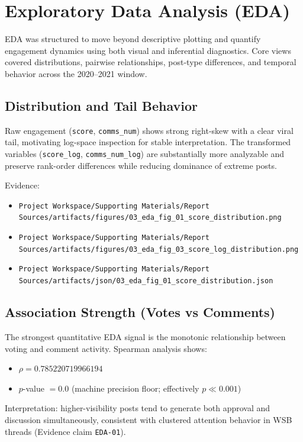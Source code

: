 \section{Exploratory Data Analysis (EDA)}

EDA was structured to move beyond descriptive plotting and quantify engagement dynamics using both visual and inferential diagnostics. Core views covered distributions, pairwise relationships, post-type differences, and temporal behavior across the 2020--2021 window.

\subsection{Distribution and Tail Behavior}
Raw engagement (\texttt{score}, \texttt{comms\_num}) shows strong right-skew with a clear viral tail, motivating log-space inspection for stable interpretation. The transformed variables (\texttt{score\_log}, \texttt{comms\_num\_log}) are substantially more analyzable and preserve rank-order differences while reducing dominance of extreme posts.

Evidence:
\begin{itemize}
  \item \verb|Project Workspace/Supporting Materials/Report Sources/artifacts/figures/03_eda_fig_01_score_distribution.png|
  \item \verb|Project Workspace/Supporting Materials/Report Sources/artifacts/figures/03_eda_fig_03_score_log_distribution.png|
  \item \verb|Project Workspace/Supporting Materials/Report Sources/artifacts/json/03_eda_fig_01_score_distribution.json|
\end{itemize}

\subsection{Association Strength (Votes vs Comments)}
The strongest quantitative EDA signal is the monotonic relationship between voting and comment activity. Spearman analysis shows:
\begin{itemize}
  \item \(\rho = 0.785220719966194\)
  \item \(p\)-value \(= 0.0\) (machine precision floor; effectively \(p \ll 0.001\))
\end{itemize}
Interpretation: higher-visibility posts tend to generate both approval and discussion simultaneously, consistent with clustered attention behavior in WSB threads (Evidence claim \texttt{EDA-01}).

